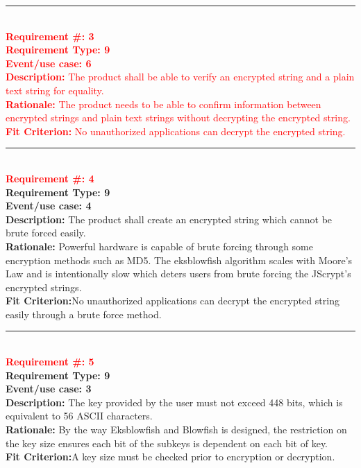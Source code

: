 \documentclass[12pt]{article}
\begin{document}
  \noindent\rule{12cm}{0.4pt} \\

  \noindent\textcolor{red}{\textbf{Requirement \#: 3}\\
  \textbf{Requirement Type: 9 }\\
  \textbf{Event/use case: 6}\\
  \textbf{Description:} The product shall be able to verify an encrypted string and a plain text string for equality.\\
  \textbf{Rationale:} The product needs to be able to confirm information between encrypted strings and plain text strings without decrypting the encrypted string.\\
  \textbf{Fit Criterion:} No unauthorized applications can decrypt the encrypted string.}\\

  \noindent\rule{12cm}{0.4pt} \\

  \noindent\textcolor{red}{\textbf{Requirement \#: 4}}\\
  \textbf{Requirement Type: 9 }\\
  \textbf{Event/use case: 4}\\
  \textbf{Description:} The product shall create an encrypted string which cannot be brute forced easily.\\
  \textbf{Rationale:}  Powerful hardware is capable of brute forcing through some encryption methods such as MD5. The eksblowfish algorithm scales with Moore’s Law and is intentionally slow which deters users from brute forcing the JScrypt’s encrypted strings.\\
  \textbf{Fit Criterion:}No unauthorized applications can decrypt the encrypted string easily through a brute force method.\\

  \noindent\rule{12cm}{0.4pt} \\

  \noindent\textcolor{red}{\textbf{Requirement \#: 5}}\\
  \textbf{Requirement Type: 9 }\\
  \textbf{Event/use case: 3 }\\
  \textbf{Description:} The key provided by the user must not exceed 448 bits, which is equivalent to 56 ASCII characters.\\
  \textbf{Rationale:} By the way Eksblowfish and Blowfish is designed, the restriction on the key size ensures each bit of the subkeys is dependent on each bit of key.\\
  \textbf{Fit Criterion:}A key size must be checked prior to encryption or decryption.\\ \\ \\
\end{document}
